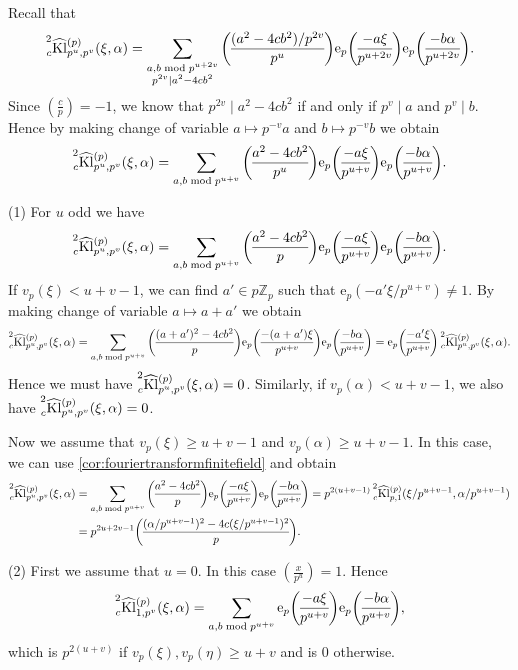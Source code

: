 \documentclass[10pt,oneside,reqno]{amsart}
\makeatletter
\newcommand\rme{\mathrm{e}}
\newcommand\ZZ{\mathbb{Z}}
\newcommand\Kl{\mathrm{Kl}}
\renewcommand\geq{\geqslant}
\newcommand\legendresymbol[2]{\genfrac{(}{)}{}{}{#1}{#2}}
\theoremstyle{THEOREM}
\theoremstyle{DEFINITION}
\theoremstyle{EXERCISE}
\numberwithin{equation}{section}
\renewenvironment{proof}[1][\proofname]{\par
  \vspace{-6pt}
  \pushQED{\qed}
  \normalfont \topsep6\p@\@plus6\p@\relax
  \trivlist
  \item[\hskip\labelsep\rmfamily\bfseries
    #1\@addpunct{:}]\ignorespaces
}{
  \popQED\endtrivlist\@endpefalse
  \vspace{-6pt}
}
\makeatother
\begin{document}
\begin{proof}
Recall that
\[
\prescript{2}{c}{\widehat{\Kl}}_{p^u,p^v}^{(p)}(\xi,\alpha)=\sum_{\substack{a,b\bmod p^{u+2v}\\ p^{2v}\mid a^2-4cb^2}}\legendresymbol{(a^2-4cb^2)/p^{2v}}{p^u}\rme_p\legendresymbol{-a\xi}{p^{u+2v}} \rme_p\legendresymbol{-b\alpha}{p^{u+2v}}.
\]
Since $\legendresymbol{c}{p}=-1$, we know that $ p^{2v}\mid a^2-4cb^2$ if and only if $p^v\mid a$ and $p^v\mid b$. Hence by making change of variable $a\mapsto p^{-v}a$ and $b\mapsto p^{-v}b$ we obtain
\[
\prescript{2}{c}{\widehat{\Kl}}_{p^u,p^v}^{(p)}(\xi,\alpha)=\sum_{a,b\bmod p^{u+v}}\legendresymbol{a^2-4cb^2}{p^u} \rme_p\legendresymbol{-a\xi}{p^{u+v}} \rme_p\legendresymbol{-b\alpha}{p^{u+v}}.
\]

(1) For $u$ odd we have
\[
\prescript{2}{c}{\widehat{\Kl}}_{p^u,p^v}^{(p)}(\xi,\alpha)=\sum_{a,b\bmod p^{u+v}}\legendresymbol{a^2-4cb^2}{p} \rme_p\legendresymbol{-a\xi}{p^{u+v}} \rme_p\legendresymbol{-b\alpha}{p^{u+v}}.
\]
If $v_p(\xi)<u+v-1$, we can find $a'\in p\ZZ_p$ such that $\rme_p(-a'\xi/p^{u+v})\neq 1$. By making change of variable $a\mapsto a+a'$ we obtain
\[
\prescript{2}{c}{\widehat{\Kl}}_{p^u,p^v}^{(p)}(\xi,\alpha)=\sum_{a,b\bmod p^{u+v}}\legendresymbol{(a+a')^2-4cb^2}{p} \rme_p\legendresymbol{-(a+a')\xi}{p^{u+v}} \rme_p\legendresymbol{-b\alpha}{p^{u+v}}=\rme_p\legendresymbol{-a'\xi}{p^{u+v}} \prescript{2}{c}{\widehat{\Kl}}_{p^u,p^v}^{(p)}(\xi,\alpha).
\]
Hence we must have $\prescript{2}{c}{\widehat{\Kl}}_{p^u,p^v}^{(p)}(\xi,\alpha)=0$. Similarly, if $v_p(\alpha)<u+v-1$, we also have $\prescript{2}{c}{\widehat{\Kl}}_{p^u,p^v}^{(p)}(\xi,\alpha)=0$.

Now we assume that $v_p(\xi)\geq u+v-1$ and $v_p(\alpha)\geq u+v-1$. In this case, we can use \autoref{cor:fouriertransformfinitefield} and obtain
\begin{align*}
\prescript{2}{c}{\widehat{\Kl}}_{p^u,p^v}^{(p)}(\xi,\alpha)&=\sum_{a,b\bmod p^{u+v}}\legendresymbol{a^2-4cb^2}{p} \rme_p\legendresymbol{-a\xi}{p^{u+v}} \rme_p\legendresymbol{-b\alpha}{p^{u+v}}=p^{2(u+v-1)} \prescript{2}{c}{\widehat{\Kl}}_{p,1}^{(p)}(\xi/p^{u+v-1},\alpha/p^{u+v-1})\\
&=p^{2u+2v-1} \legendresymbol{(\alpha/p^{u+v-1})^2-4c(\xi/p^{u+v-1})^2}{p}.
\end{align*}

(2) First we assume that $u=0$. In this case $\legendresymbol{x}{p^u}=1$. Hence
\[
\prescript{2}{c}{\widehat{\Kl}}_{1,p^v}^{(p)}(\xi,\alpha)=\sum_{a,b\bmod p^{u+v}} \rme_p\legendresymbol{-a\xi}{p^{u+v}} \rme_p\legendresymbol{-b\alpha}{p^{u+v}},
\]
which is $p^{2(u+v)}$ if $v_p(\xi),v_p(\eta)\geq u+v$ and is $0$ otherwise.


\end{proof}
\end{document}
